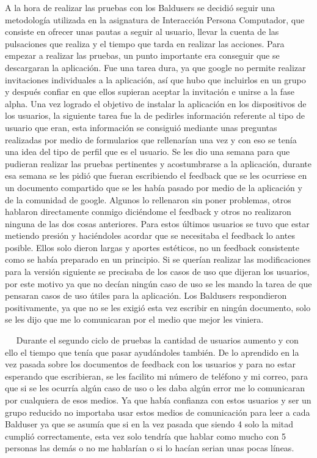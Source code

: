 A la hora de realizar las pruebas con los Baldusers se decidió seguir una metodología utilizada en la asignatura de Interacción Persona Computador, que consiste en ofrecer unas pautas a seguir al usuario, llevar la cuenta de las pulsaciones que realiza y el tiempo que tarda en realizar las acciones.
Para empezar a realizar las pruebas, un punto importante era conseguir que se descargaran la aplicación.
Fue una tarea dura, ya que google no permite realizar invitaciones individuales a la aplicación, así que hubo que incluirlos en un grupo y después confiar en que ellos supieran aceptar la invitación e unirse a la fase alpha.
Una vez logrado el objetivo de instalar la aplicación en los dispositivos de los usuarios, la siguiente tarea fue la de pedirles información referente al tipo de usuario que eran, esta información se consiguió mediante unas preguntas realizadas por medio de formularios que rellenarían una vez y con eso se tenía una idea del tipo de perfil que es el usuario. 
Se les dio una semana para que pudieran realizar las pruebas pertinentes y acostumbrarse a la aplicación, durante esa semana se les pidió que fueran escribiendo el feedback que se les ocurriese en un documento compartido que se les había pasado por medio de la aplicación y de la comunidad de google.
Algunos lo rellenaron sin poner problemas, otros hablaron directamente conmigo diciéndome el feedback y otros no realizaron ninguna de las dos cosas anteriores.
Para estos últimos usuarios se tuvo que estar metiendo presión y haciéndoles acordar que se necesitaba el feedback lo antes posible. Ellos solo dieron largas y aportes estéticos, no un feedback consistente como se había preparado en un principio.
Si se querían realizar las modificaciones para la versión siguiente se precisaba de los casos de uso que dijeran los usuarios, por este motivo ya que no decían ningún caso de uso se les mando la tarea de que pensaran casos de uso útiles para la aplicación.
Los Baldusers respondieron positivamente, ya que no se les exigió esta vez escribir en ningún documento, solo se les dijo que me lo comunicaran por el medio que mejor les viniera.

 
Durante el segundo ciclo de pruebas la cantidad de usuarios aumento y con ello el tiempo que tenía que pasar ayudándoles también.
De lo aprendido en la vez pasada sobre los documentos de feedback con los usuarios y para no estar esperando que escribieran, se les facilito mi número de teléfono y mi correo, para que si se les ocurría algún caso de uso o les daba algún error me lo comunicaran por cualquiera de esos medios. Ya que había confianza con estos usuarios y ser un grupo reducido no importaba usar estos medios de comunicación para leer a cada Balduser ya que se asumía que si en la vez pasada que siendo 4 solo la mitad cumplió correctamente, esta vez solo tendría que hablar como mucho con 5 personas las demás o no me hablarían o si lo hacían serian unas pocas líneas.

